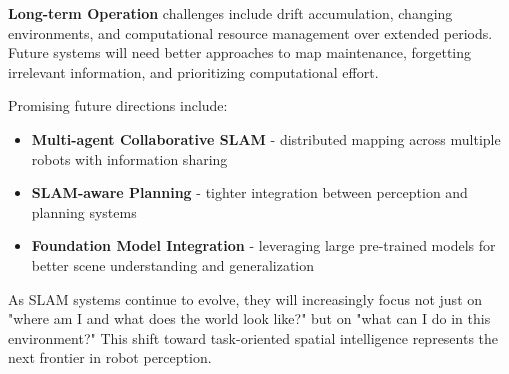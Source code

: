 \documentclass[12pt]{article}
\begin{document}
    \textbf{Long-term Operation} challenges include drift accumulation, changing environments, and computational resource management over extended periods. Future systems will need better approaches to map maintenance, forgetting irrelevant information, and prioritizing computational effort.
    
    Promising future directions include:
    
    \begin{itemize}
        \item \textbf{Multi-agent Collaborative SLAM} - distributed mapping across multiple robots with information sharing
        \item \textbf{SLAM-aware Planning} - tighter integration between perception and planning systems
        \item \textbf{Foundation Model Integration} - leveraging large pre-trained models for better scene understanding and generalization
    \end{itemize}
    
    As SLAM systems continue to evolve, they will increasingly focus not just on "where am I and what does the world look like?" but on "what can I do in this environment?" This shift toward task-oriented spatial intelligence represents the next frontier in robot perception.

    
    \newpage
    \printbibliography[title={References}]
\end{document}
